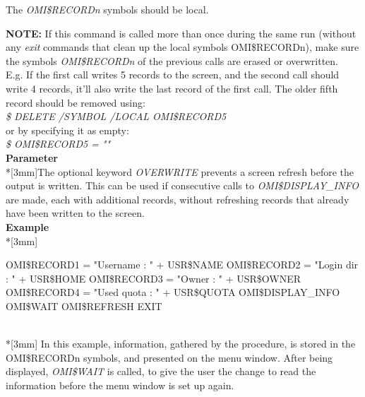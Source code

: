 \documentclass[a4paper]{book}
\newcommand{\vs}{\vspace{3mm}}
\renewcommand{\indent}{\hspace*{5mm}}
\begin{document}
The \textsl{OMI{\$}RECORD\textit{n}} symbols should be local.

\vs

\hspace{-8mm}\textbf{NOTE:}\label{note:dispinfo} If this command is called more than once during the same run 
(without any \textsl{exit} commands that clean up the local symbols 
OMI{\$}RECORDn), make sure the symbols \textsl{OMI{\$}RECORD\textit{n}} of the previous calls 
are erased or overwritten. \\
E.g. If the first call writes 5 records to the screen, and the second call 
should write 4 records, it'll also write the last record of the first call. 
The older fifth record should be removed using:\\
\indent\textsl{{\$} DELETE /SYMBOL /LOCAL OMI{\$}RECORD5} \\
or by specifying it as empty: \\
\indent\textsl{{\$} OMI{\$}RECORD5 = ""}\\[3mm]
\textbf{Parameter}\\*[3mm]The optional keyword \textsl{OVERWRITE} prevents a screen refresh before the output is written. This can be used if consecutive calls to \textsl{OMI{\$}DISPLAY{\_}INFO} are made, each  with additional records, without refreshing records that already have been written to the screen.\\[3mm]
\textbf{Example}\\*[3mm]
\begin{textsf}
\indent{\$} OMI{\$}RECORD1 = "Username : " + USR{\$}NAME \newline
\indent{\$} OMI{\$}RECORD2 = "Login dir : " + USR{\$}HOME \newline
\indent{\$} OMI{\$}RECORD3 = "Owner : " + USR{\$}OWNER \newline
\indent{\$} OMI{\$}RECORD4 = "Used quota : " + USR{\$}QUOTA \newline
\indent{\$} OMI{\$}DISPLAY{\_}INFO \newline
\indent{\$} OMI{\$}WAIT \newline
\indent{\$} OMI{\$}REFRESH \newline
\indent{\$} EXIT
\end{textsf}\\*[3mm]
In this example, information, gathered by the procedure, is stored in the 
\linebreak OMI{\$}RECORDn symbols, and presented on the menu window. After being 
displayed, \textsl{OMI{\$}WAIT} is called, 
to give the user the change to read the information before the menu window 
is set up again.
\end{document}
